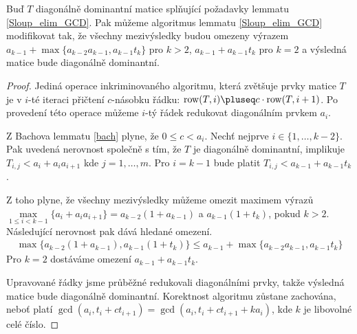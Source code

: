 \begin{lem} \label{Sloup_elim_GCD_modified}
Buď $ T $ diagonálně dominantní matice splňující požadavky lemmatu \ref{Sloup_elim_GCD}.
Pak můžeme algoritmus lemmatu \ref{Sloup_elim_GCD} modifikovat tak, že všechny
mezivýsledky budou omezeny výrazem 
$ a_{k - 1} + \max \{ a_{k - 2} a_{k - 1}, a_{k - 1} t_k \} $ pro $ k > 2 $,
$ a_{k - 1} + a_{k - 1} t_k $ pro $ k = 2 $
a výsledná matice bude diagonálně dominantní.
\end{lem}
\begin{proof}
Jediná operace inkriminovaného algoritmu, která zvětšuje prvky matice $ T $ je
v $ i $-té iteraci přičtení $ c $-násobku řádku: 
$ \operatorname{row}(T, i) \pluseq c \cdot \operatorname{row}(T, i + 1) $. Po
provedení této operace můžeme $ i $-tý řádek redukovat diagonálním prvkem $ a_i $.

Z Bachova lemmatu \ref{bach} plyne, že $ 0 \leq c < a_i $. 
Nechť nejprve $ i \in \{1, \dots, k - 2 \} $. Pak uvedená nerovnost společně s
tím, že $ T $ je diagonálně dominantní, implikuje $ T_{i, j} < a_i + a_i a_{i+1} $ kde
$ j = 1, \dots, m $. Pro $ i = k - 1 $ bude platit $ T_{i, j} < a_{k-1} + a_{k - 1} t_k $.

Z toho plyne, že všechny mezivýsledky můžeme omezit maximem výrazů
$ \max\limits_{1 \leq i < k - 1}\{ a_i + a_i a_{i+1} \} = a_{k - 2} ( 1 + a_{k - 1} )$ 
a $ a_{k - 1} ( 1 + t_k )$, pokud $ k > 2 $. Následující nerovnost pak dává 
hledané omezení.
\begin{align*}
    \max \{ a_{k - 2} ( 1 + a_{k - 1}),  a_{k - 1} ( 1 + t_k ) \} 
        \leq  a_{k - 1} + \max \{ a_{k - 2} a_{k - 1}, a_{k - 1} t_k \}
\end{align*}
Pro $ k = 2 $ dostáváme omezení $ a_{k - 1} + a_{k - 1} t_k $.

Upravované řádky jsme průběžné redukovali diagonálními prvky, takže výsledná 
matice bude diagonálně dominantní. Korektnost algoritmu zůstane zachována, 
neboť platí $ \gcd(a_i, t_{i} + ct_{i+1}) = \gcd(a_i, t_{i} + ct_{i+1} + k a_i) $,
kde $ k $ je libovolné celé číslo.
\end{proof}




